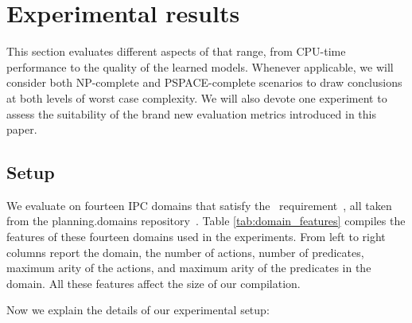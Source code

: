 
\section{Experimental results}
\label{sec:experiments}

This section evaluates different aspects of \FAMA that range, from CPU-time performance to the quality of the learned models. Whenever applicable, we will consider both NP-complete and PSPACE-complete scenarios to draw conclusions at both levels of worst case complexity. We will also devote one experiment to assess the suitability of the brand new evaluation metrics introduced in this paper. 

\subsection{Setup}
We evaluate \FAMA on fourteen IPC domains that satisfy the \strips\ requirement~\cite{fox2003pddl2}, all taken from the {\sc planning.domains} repository~\cite{muise2016planning}. Table \ref{tab:domain_features} compiles the features of these fourteen domains used in the experiments. From left to right columns report the domain, the number of actions, number of predicates, maximum arity of the actions, and maximum arity of the predicates in the domain. All these features affect the size of our compilation. %

Now we explain the details of our experimental setup:

